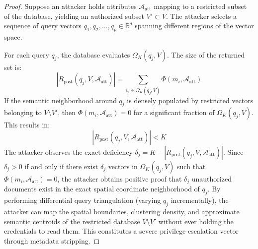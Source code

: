 \documentclass[sigconf]{acmart}
\begin{document}
\begin{proof}
Suppose an attacker holds attributes $\mathcal{A}_{\text{att}}$ mapping to a restricted subset of the database, yielding an authorized subset $V' \subset V$. The attacker selects a sequence of query vectors $q_1, q_2, \dots, q_p \in \mathbb{R}^d$ spanning different regions of the vector space.

For each query $q_j$, the database evaluates $\Omega_K(q_j, V)$. The size of the returned set is:
\begin{equation}
    |R_{\text{post}}(q_j, V, \mathcal{A}_{\text{att}})| = \sum_{v_i \in \Omega_K(q_j, V)} \Phi(m_i, \mathcal{A}_{\text{att}})
\end{equation}
If the semantic neighborhood around $q_j$ is densely populated by restricted vectors belonging to $V \setminus V'$, then $\Phi(m_i, \mathcal{A}_{\text{att}}) = 0$ for a significant fraction of $\Omega_K(q_j, V)$. This results in:
\begin{equation}
    |R_{\text{post}}(q_j, V, \mathcal{A}_{\text{att}})| < K
\end{equation}
The attacker observes the exact deficiency $\delta_j = K - |R_{\text{post}}(q_j, V, \mathcal{A}_{\text{att}})|$. Since $\delta_j > 0$ if and only if there exist $\delta_j$ vectors in $\Omega_K(q_j, V)$ such that $\Phi(m_i, \mathcal{A}_{\text{att}}) = 0$, the attacker obtains positive proof that $\delta_j$ unauthorized documents exist in the exact spatial coordinate neighborhood of $q_j$. By performing differential query triangulation (varying $q_j$ incrementally), the attacker can map the spatial boundaries, clustering density, and approximate semantic centroids of the restricted database $V \setminus V'$ without ever holding the credentials to read them. This constitutes a severe privilege escalation vector through metadata stripping.
\end{proof}
\end{document}
